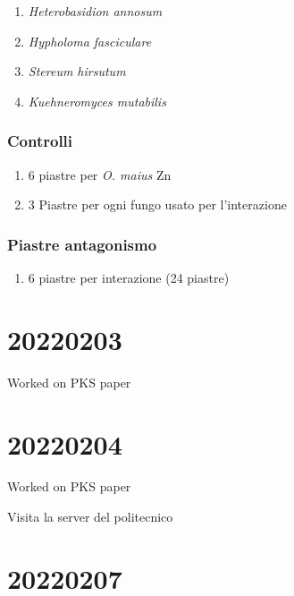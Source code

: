\documentclass[
]{book}
\providecommand{\tightlist}{%
  \setlength{\itemsep}{0pt}\setlength{\parskip}{0pt}}
\begin{document}
\begin{enumerate}
\def\labelenumi{\arabic{enumi}.}
\tightlist
\item
  \emph{Heterobasidion annosum}\\
\item
  \emph{Hypholoma fasciculare}\\
\item
  \emph{Stereum hirsutum}\\
\item
  \emph{Kuehneromyces mutabilis}
\end{enumerate}

\hypertarget{controlli}{%
\subsubsection{Controlli}\label{controlli}}

\begin{enumerate}
\def\labelenumi{\arabic{enumi}.}
\item
  6 piastre per \emph{O. maius} Zn
\item
  3 Piastre per ogni fungo usato per l'interazione
\end{enumerate}

\hypertarget{piastre-antagonismo}{%
\subsubsection{Piastre antagonismo}\label{piastre-antagonismo}}

\begin{enumerate}
\def\labelenumi{\arabic{enumi}.}
\tightlist
\item
  6 piastre per interazione (24 piastre)
\end{enumerate}

\hypertarget{D20220203}{%
\section{20220203}\label{D20220203}}

Worked on PKS paper

\hypertarget{D20220204}{%
\section{20220204}\label{D20220204}}

Worked on PKS paper

Visita la server del politecnico

\hypertarget{D20220207}{%
\section{20220207}\label{D20220207}}
\end{document}
